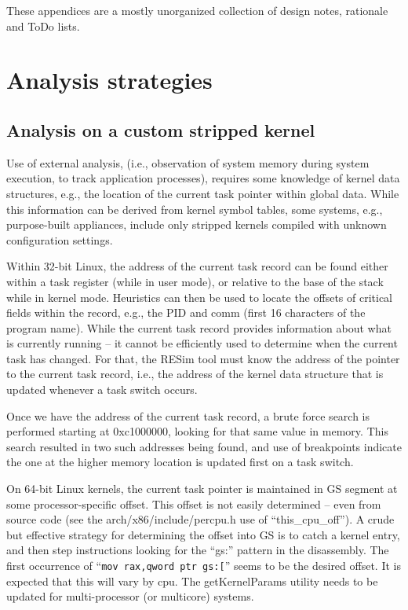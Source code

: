 \documentclass[titlepage]{article}
\begin{document}
\pagebreak
\begin{appendices}
These appendices are a mostly unorganized collection of design notes, rationale and ToDo lists.
\section{Analysis strategies}
\subsection{Analysis on a custom stripped kernel}
Use of external analysis, (i.e., observation of system memory during system execution, to track application processes), requires some knowledge of kernel data structures, e.g., the location of the current task pointer within global data.   While this information can be derived from kernel symbol tables, some systems, e.g., purpose-built appliances, include only stripped kernels compiled with unknown configuration settings.

Within 32-bit Linux, the address of the current task record can be found either within a task register (while in user mode), or relative to the base of the stack while in kernel mode.  Heuristics can then be used to locate the offsets of critical fields within the record, e.g., the PID and comm (first 16 characters of the program name).  While the current task record provides information about what is currently running – it cannot be efficiently used to determine when the current task has changed.  For that, the RESim tool must know the address of the pointer to the current task record, i.e., the address of the kernel data structure that is updated whenever a task switch occurs.

Once we have the address of the current task record, a brute force search is performed starting at 0xc1000000, looking for that same value in memory.  This search resulted in two such addresses being found, and use of breakpoints indicate the one at the higher memory location is updated first on a task switch. 

On 64-bit Linux kernels, the current task pointer is maintained in GS segment at some processor-specific offset.  This offset is not easily determined – even from source code (see the arch/x86/include/percpu.h use of “this\_cpu\_off”).  A crude but effective strategy for determining the offset into GS is to catch a kernel entry, and then step instructions looking for the ``gs:'' pattern in the disassembly.  The first occurrence of ``{\tt mov rax,qword ptr gs:[}''  seems to be the desired offset.  It is expected that this will vary by cpu. The getKernelParams utility needs to be updated for multi-processor (or multicore) systems.


\end{appendices}
\end{document}
